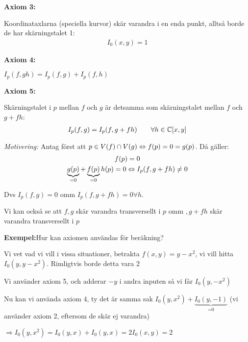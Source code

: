 \par\bigskip
\noindent\textbf{Axiom 3:}\par
\noindent Koordinataxlarna (speciella kurvor) skär varandra i en enda punkt, alltså borde de har skärningstalet 1:
\begin{equation*}
  \begin{gathered}
    I_0(x,y) = 1
  \end{gathered}
\end{equation*}
\par\bigskip
\noindent\textbf{Axiom 4:}\par
\noindent $I_p(f,gh) = I_p(f,g)+I_p(f,h)$ 
\par\bigskip
\noindent\textbf{Axiom 5:}\par
\noindent Skärningstalet i $p$ mellan $f$ och $g$ är detsamma som skärningstalet mellan $f$ och $g+fh$:
\begin{equation*}
  \begin{gathered}
    I_p(f,g) = I_p(f,g+fh)\qquad\forall h\in\mathbb{C}[x,y]
  \end{gathered}
\end{equation*}\par
\noindent\textit{Motivering:} Antag först att $p\in V(f)\cap V(g)\Leftrightarrow f(p)=0=g(p)$. Då gäller:
\begin{equation*}
  \begin{gathered}
    f(p) = 0\\
    \underbrace{g(p)}_{\text{=0}}+\underbrace{f(p)}_{\text{=0}}h(p) = 0\Leftrightarrow I_p(f,g+fh)\neq0
  \end{gathered}
\end{equation*}\par
\noindent Dvs $I_p(f,g) = 0$ omm $I_p(f,g+fh) = 0 \forall h$.\par
\noindent Vi kan också se att $f,g$ skär varandra transversellt i $p$ omm $,g+fh$ skär varandra transversellt i $p$ 
\par\bigskip
\noindent\textbf{Exempel:}Hur kan axiomen användas för beräkning?\par
\noindent Vi vet vad vi vill i vissa situationer, betrakta $f(x,y) = y-x^2$, vi vill hitta $I_0(y,y-x^2)$. Rimligtvis borde detta vara 2
\par\bigskip
\noindent Vi använder axiom 5, och adderar $-y$ i andra inputen så vi får $I_0(y,-x^2)$\par
\noindent Nu kan vi använda axiom 4, ty det är samma sak $I_0(y,x^2) + \underbrace{I_0(y,-1)}_{\text{=0}}$ (vi använder axiom 2, eftersom de skär ej varandra)\par
\noindent $\Rightarrow I_0(y,x^2)=I_0(y,x)+I_0(y,x)=2I_0(x,y)=2$
\par\bigskip
